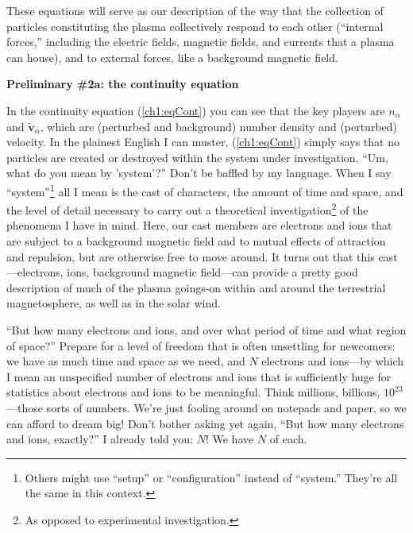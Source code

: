 These equations will serve as our description of the way that the collection of
particles constituting the plasma collectively respond to each other (``internal
forces,'' including the electric fields, magnetic fields, and currents that a
plasma can house), and to external forces, like a background magnetic field.

\textbf{Preliminary \#2a: the continuity equation}

In the continuity equation (\ref{ch1:eqCont}) you can see that the key players
are $n_{\alpha}$ and $\mathbf{\tilde v}_{\alpha}$, which are (perturbed and
background) number density and (perturbed) velocity. In the plainest English I
can muster, (\ref{ch1:eqCont}) simply says that no particles are created or
destroyed within the system under investigation. ``Um, what do you mean by
'system'?'' Don't be baffled by my language. When I say
``system''\footnote{Others might use ``setup'' or ``configuration'' instead of
  ``system.'' They're all the same in this context.} all I mean is the cast of
characters, the amount of time and space, and the level of detail necessary to
carry out a theoretical investigation\footnote{As opposed to experimental
  investigation.} of the phenomena I have in mind. Here, our cast members are
electrons and ions that are subject to a background magnetic field and to mutual
effects of attraction and repulsion, but are otherwise free to move around. It
turns out that this cast---electrons, ions, background magnetic field---can
provide a pretty good description of much of the plasma goings-on within and
around the terrestrial magnetosphere, as well as in the solar wind.

``But how many electrons and ions, and over what period of time and what region
of space?'' Prepare for a level of freedom that is often unsettling for
newcomers: we have as much time and space as we need, and $N$ electrons and
ions---by which I mean an unspecified number of electrons and ions that is
sufficiently huge for statistics about electrons and ions to be
meaningful. Think millions, billions, $10^{23}$---those sorts of numbers. We're
just fooling around on notepads and paper, so we can afford to dream big! Don't
bother asking yet again, ``But how many electrons and ions, exactly?'' I already
told you: $N$! We have $N$ of each.

